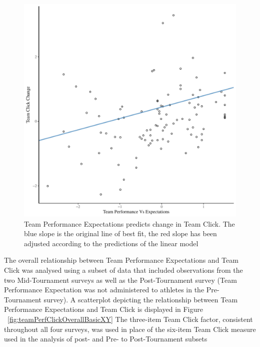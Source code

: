 \begin{CJK}{UTF8}{gbsn}

    
    


    \begin{figure}[htbp]
      \centering
    \includegraphics[scale=.5]{images/teamPerfClickDeltaModelSlope.pdf}
      \caption{Team Performance Expectations predicts change in Team Click. The blue slope is the original line of best fit, the red slope has been adjusted according to the predictions of the linear model}
      \label{fig:teamPerfClickDeltaModelSlope}
    \end{figure}




The overall relationship between Team Performance Expectations and Team Click was analysed using a subset of data that included observations from the two Mid-Tournament surveys as well as the Post-Tournament survey (Team Performance Expectation was not administered to athletes in the Pre-Tournament survey).  A scatterplot depicting the relationship between Team Performance Expectations and Team Click is displayed in Figure ~\ref{fig:teamPerfClickOverallBasicXY} The three-item Team Click factor, consistent throughout all four surveys, was used in place of the six-item Team Click measure used in the analysis of post- and Pre- to Post-Tournament subsets


\end{CJK}
